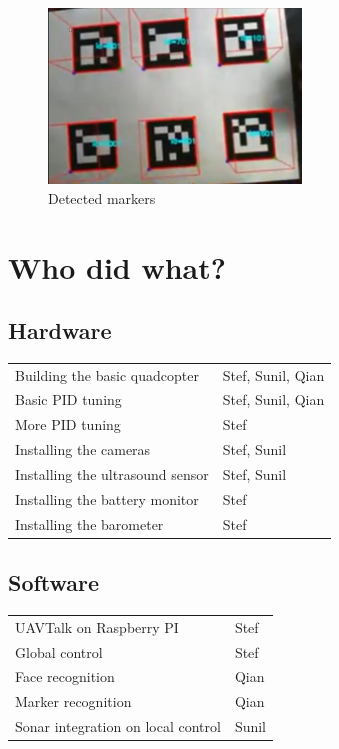 \documentclass[11pt, a4paper, onecolumn, oneside, parskip=half]{scrartcl}
\begin{document}
\begin{figure}[ht]
\centering
\includegraphics[width=0.6\textwidth]{image05}
\caption{Detected markers}
\label{fig:markerdetected}
\end{figure}

\FloatBarrier
\hbox{}
\newpage
\appendix

\section{Who did what?}
\subsection{Hardware}
\begin{tabular}{ll}
Building the basic quadcopter & Stef, Sunil, Qian \\
Basic PID tuning & Stef, Sunil, Qian \\
More PID tuning & Stef \\
Installing the cameras & Stef, Sunil \\
Installing the ultrasound sensor & Stef, Sunil \\
Installing the battery monitor & Stef \\
Installing the barometer & Stef \\
\end{tabular}

\subsection{Software}
\begin{tabular}{ll}
UAVTalk on Raspberry PI & Stef \\
Global control & Stef \\
Face recognition & Qian \\
Marker recognition & Qian \\
Sonar integration on local control & Sunil \\
\end{tabular}
\end{document}
